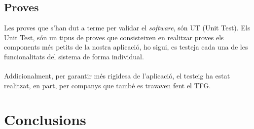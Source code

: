 \documentclass[11pt,catalan,listoffigures,listoftables]{tfgetsinf}
\begin{document}
\section{Proves}
Les proves que s'han dut a terme per validar el \textit{software}, són UT (Unit Test). Els Unit Test, són un tipus de proves que consisteixen en realitzar proves els components més petits de la nostra aplicació, ho sigui, es testeja cada una de les funcionalitats del sistema de forma individual.\\ \\
Addicionalment, per garantir més rigidesa de l'aplicació, el testeig ha estat realitzat, en part, per companys que també es travaven fent el TFG.

\chapter{Conclusions}
\end{document}
